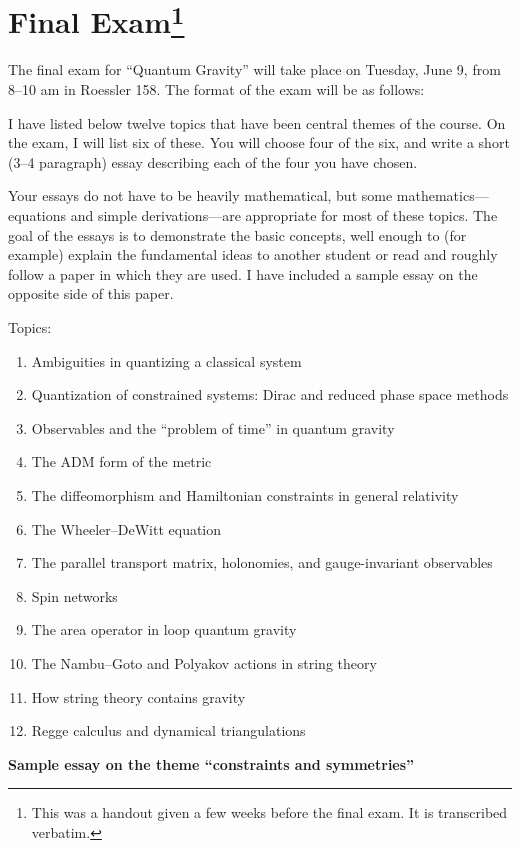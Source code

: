 \section[Final Exam]{Final Exam\footnote{This was a handout given a few weeks before the final exam. It is transcribed verbatim.}}

The final exam for ``Quantum Gravity'' will take place on Tuesday, June
9, from 8--10 am in Roessler 158. The format of the exam will be as
follows:

I have listed below twelve topics that have been central themes of the
course. On the exam, I will list six of these. You will choose four of
the six, and write a short (3--4 paragraph) essay describing each of the
four you have chosen.

Your essays do not have to be heavily mathematical, but some
mathematics---equations and simple derivations---are appropriate for
most of these topics. The goal of the essays is to demonstrate the basic
concepts, well enough to (for example) explain the fundamental ideas to
another student or read and roughly follow a paper in which they are
used. I have included a sample essay on the opposite side of this paper.

Topics:
\begin{enumerate}
\item Ambiguities in quantizing a classical system
\item Quantization of constrained systems: Dirac and reduced phase space methods
\item Observables and the ``problem of time'' in quantum gravity
\item The ADM form of the metric
\item The diffeomorphism and Hamiltonian constraints in general relativity
\item The Wheeler--DeWitt equation
\item The parallel transport matrix, holonomies, and gauge-invariant observables
\item Spin networks
\item The area operator in loop quantum gravity
\item The Nambu--Goto and Polyakov actions in string theory
\item How string theory contains gravity
\item Regge calculus and dynamical triangulations
\end{enumerate}

\vfill\eject

\noindent\textbf{Sample essay on the theme ``constraints and
  symmetries''}

